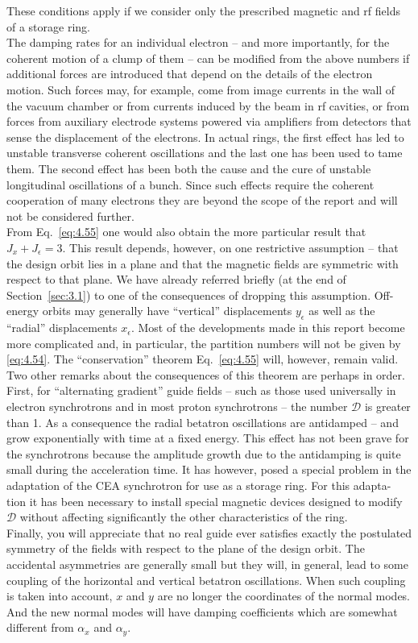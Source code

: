  These conditions apply if we consider only the prescribed magnetic and rf fields of a storage ring.\\
The damping rates for an individual electron -- and more importantly, for the coherent motion of a clump of them -- can be modified from the above numbers if additional forces are introduced
 that depend on the details of the electron motion. Such forces may, for example, come from image currents in the wall of the vacuum chamber or from currents induced by the beam in rf cavities, or from forces from auxiliary electrode systems powered via amplifiers from detectors that sense the displacement of the electrons. In actual rings, the first effect has led to unstable transverse coherent oscillations and the last one has been used to tame them. The
second effect has been both the cause and the cure of unstable longitudinal oscillations of a bunch. Since such effects require the coherent cooperation of many electrons they are beyond the scope of the report and will not be considered further.\\
From Eq.~\eqref{eq:4.55} one would also obtain the more particular result that $J_x+ J_\epsilon = 3$. This result depends, however, on one restrictive assumption -- that the design orbit lies in a plane and that the magnetic fields are symmetric with respect to that plane. We have already referred briefly (at the end of Section~\ref{sec:3.1}) to one of the consequences of dropping this assumption. Off-energy orbits may generally have ``vertical'' displacements $y_\epsilon$ as well as the ``radial'' displacements $x_\epsilon$. Most of the developments
 made in this report become more complicated and, in particular, the partition numbers will not be given by \eqref{eq:4.54}. The ``conservation'' theorem Eq.~\eqref{eq:4.55} will, however,
 remain valid.\\
Two other remarks about the consequences of this theorem are perhaps in order. First, for ``alternating gradient'' guide fields -- such as those used universally in electron synchrotrons
 and in most proton synchrotrons -- the number $\mathscr{D}$ is greater than 1. As a consequence the radial betatron oscillations are antidamped -- and grow exponentially with time at a fixed energy. This effect has not been grave for the synchrotrons because the amplitude growth due to the antidamping is quite small during the acceleration time. It has however, posed a special problem in the adaptation of the CEA synchrotron for use as a storage ring. For this adapta-
tion it has been necessary to install special magnetic devices designed to modify $\mathscr{D}$
 without affecting significantly the other characteristics of the ring.\\
 Finally, you will appreciate that no real guide ever satisfies exactly the postulated symmetry
 of the fields with respect to the plane of the design orbit. The accidental asymmetries
 are generally small but they will, in general, lead to some coupling of the horizontal and vertical betatron oscillations. When such coupling is taken into account, $x$ and $y$ are no longer the coordinates of the normal modes. And the new normal modes will have damping coefficients which are somewhat different from $\alpha_x$ and $\alpha_y$.
